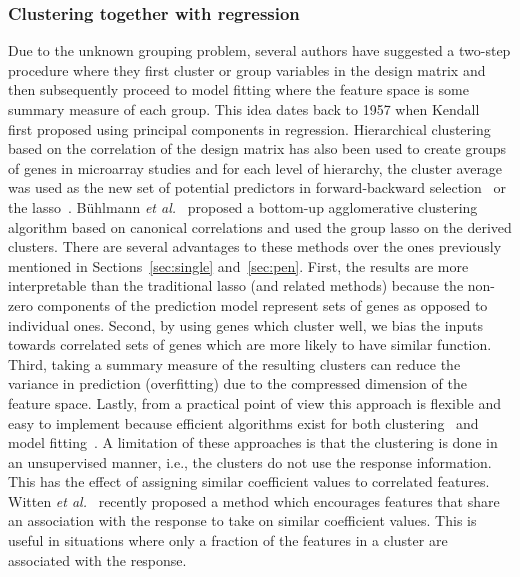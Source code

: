 \documentclass[12pt,letterpaper]{article}
\begin{document}
\subsubsection{Clustering together with regression}
Due to the unknown grouping problem, several authors have suggested a two-step procedure where they first cluster or group variables in the design matrix and then subsequently proceed to model fitting where the feature space is some summary measure of each group. 
This idea dates back to 1957 when Kendall~\citep{kendall1975multivariate} first proposed using principal components in regression. Hierarchical clustering based on the correlation of the design matrix has also been used to create groups of genes in microarray studies and for each level of hierarchy, the cluster average was used as the new set of potential predictors in forward-backward selection~\citep{hastie2001supervised} or the lasso~\citep{park2007averaged}. B{\"u}hlmann \textit{et al.}~\citep{buhlmann2013correlated} proposed a bottom-up agglomerative clustering algorithm based on canonical correlations and used the group lasso on the derived clusters. 
There are several advantages to these methods over the ones previously mentioned in Sections~\ref{sec:single} and~\ref{sec:pen}. 
First, the results are more interpretable than the traditional lasso (and related methods) because the non-zero components of the prediction model represent sets of genes as opposed to individual ones. Second, by using genes which cluster well, we bias the inputs towards correlated sets of genes     
which are more likely to have similar function. 
Third, taking a summary measure of the resulting clusters can reduce the variance in prediction (overfitting) due to the compressed dimension of the feature space. Lastly, from a practical point of view this approach is flexible and easy to implement because efficient algorithms exist for both clustering~\citep{fastclust} and model fitting~\citep{friedman2010regularization,gglasso}. 
A limitation of these approaches is that the clustering is done in an unsupervised manner, i.e., the clusters do not use the response information. This has the effect of assigning similar coefficient values to correlated features. Witten \textit{et al.}~\citep{witten2014cluster} recently proposed a method which encourages features that share an association with the response to take on similar coefficient values. 
This is useful in situations where only a fraction of the features in a cluster are associated with the response. 
\end{document}
